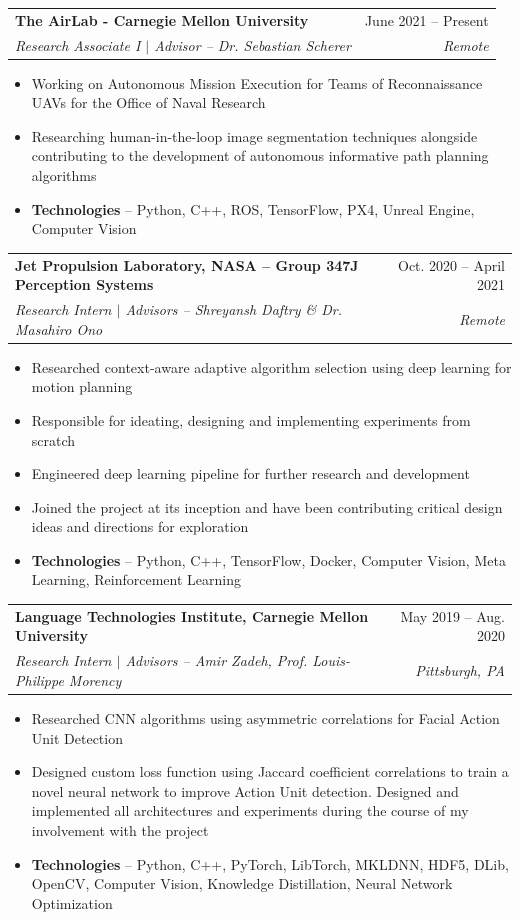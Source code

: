 \documentclass[letterpaper,11pt]{article}
\makeatletter
\newcommand{\resumeItem}[1]{
  \item\small{
    {#1 \vspace{-2pt}}
  }
}
\newcommand{\resumeSubheading}[4]{
  \vspace{-2pt}\item
    \begin{tabular*}{0.97\textwidth}[t]{l@{\extracolsep{\fill}}r}
      \textbf{#1} & #2 \\
      \textit{\small#3} & \textit{\small #4} \\
    \end{tabular*}\vspace{-7pt}
}
\newcommand{\resumeItemListStart}{\begin{itemize}}
\newcommand{\resumeItemListEnd}{\end{itemize}\vspace{-5pt}}
\makeatother
\begin{document}
      \resumeSubheading
      {The AirLab - Carnegie Mellon University}{June 2021 -- Present}
      {Research Associate I $|$ Advisor -- Dr. Sebastian Scherer}{Remote}
      \resumeItemListStart
        \resumeItem{Working on Autonomous Mission Execution for Teams of Reconnaissance UAVs for the Office of Naval Research}
        \resumeItem{Researching human-in-the-loop image segmentation techniques alongside contributing to the development of autonomous informative path planning algorithms}
        \resumeItem{\textbf{Technologies} -- Python, C++, ROS, TensorFlow, PX4, Unreal Engine, Computer Vision}
      \resumeItemListEnd

    \resumeSubheading
      {Jet Propulsion Laboratory, NASA -- Group 347J Perception Systems}{Oct. 2020 -- April 2021}
      {Research Intern $|$ Advisors -- Shreyansh Daftry \& Dr. Masahiro Ono}{Remote}
      \resumeItemListStart
        \resumeItem{Researched context-aware adaptive algorithm selection using deep learning for motion planning}
        \resumeItem{Responsible for ideating, designing and implementing experiments from scratch}
        \resumeItem{Engineered deep learning pipeline for further research and development}
        \resumeItem{Joined the project at its inception and have been contributing critical design ideas and directions for exploration}
        \resumeItem{\textbf{Technologies} -- Python, C++, TensorFlow, Docker, Computer Vision, Meta Learning, Reinforcement Learning}
      \resumeItemListEnd

    \resumeSubheading
      {Language Technologies Institute, Carnegie Mellon University}{May 2019 -- Aug. 2020}
      {Research Intern $|$ Advisors -- Amir Zadeh, Prof. Louis-Philippe Morency}{Pittsburgh, PA}
      \resumeItemListStart
        \resumeItem{Researched CNN algorithms using asymmetric correlations for Facial Action Unit Detection}
        \resumeItem{Designed custom loss function using Jaccard coefficient correlations to train a novel neural network to improve Action Unit detection. Designed and implemented all architectures and experiments during the course of my involvement with the project}
        \resumeItem{\textbf{Technologies} -- Python, C++, PyTorch, LibTorch, MKLDNN, HDF5, DLib, OpenCV, Computer Vision, Knowledge Distillation, Neural Network Optimization}
    \resumeItemListEnd

      
\end{document}
